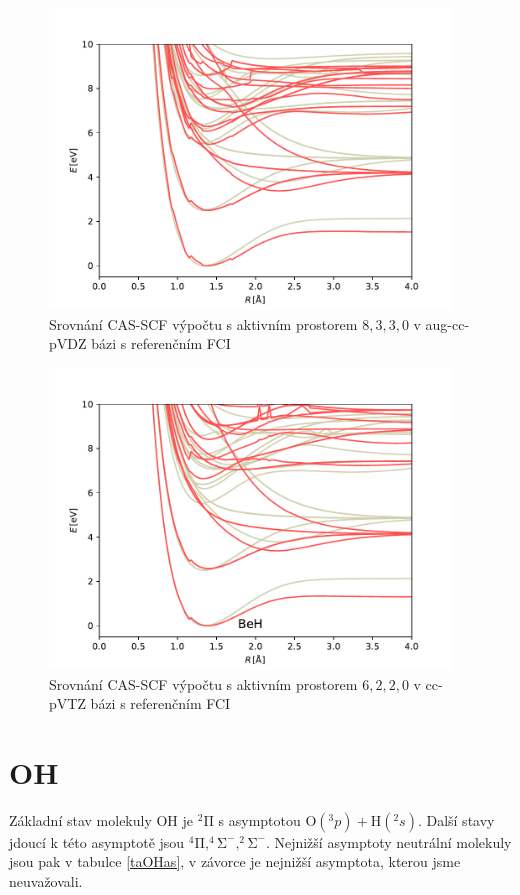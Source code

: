 \begin{figure}
\centering
\includegraphics[width=0.95\textwidth]{../img/BeH-MULTI-DZ-8330.pdf}
\caption{Srovnání CAS-SCF výpočtu s aktivním prostorem $8,3,3,0$ v aug-cc-pVDZ bázi s referenčním FCI}
\label{gr_Beh_8330}
\end{figure}

\begin{figure}
\centering
\includegraphics[width=0.95\textwidth]{../img/BeH-MULTI-TZ-6220.pdf}
\caption{Srovnání CAS-SCF výpočtu s aktivním prostorem $6,2,2,0$ v cc-pVTZ bázi s referenčním FCI}
\label{gr_Beh_TZ}
\end{figure}


\section{OH}
Základní stav molekuly OH je $\mathrm{^2\Pi}$ s asymptotou 
$\mathrm{O}(^3p) + \mathrm{H}(^2s)$. Další 
stavy jdoucí k této asymptotě jsou $\mathrm{^4\Pi, ^4\Sigma^-, ^2\Sigma^- }$.
Nejnižší asymptoty neutrální molekuly jsou pak v tabulce \ref{taOHas}, v závorce je
nejnižší asymptota, kterou jsme neuvažovali.

